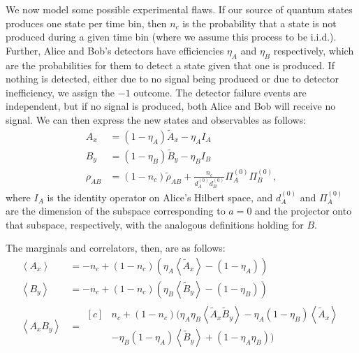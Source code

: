 \documentclass[10pt, a4paper]{article}
\numberwithin{equation}{section} %
\theoremstyle{definition}
\theoremstyle{plain}
\newcommand{\?}{\mathrel{?}} %
\newcommand{\angleb}[1]{\left\langle #1 \right\rangle} %
\begin{document}
    We now model some possible experimental flaws. If our source of quantum states produces one state per time bin, then \(n_c\) is the probability that a state is not produced during a given time bin (where we assume this process to be i.i.d.). Further, Alice and Bob's detectors have efficiencies \(\eta_A\) and \(\eta_B\) respectively, which are the probabilities for them to detect a state given that one is produced. If nothing is detected, either due to no signal being produced or due to detector inefficiency, we assign the \(-1\) outcome. The detector failure events are independent, but if no signal is produced, both Alice and Bob will receive no signal. We can then express the new states and observables as follows:
    \begin{align*}
      A_x &= (1-\eta_A)\tilde{A}_x - \eta_A I_A \\
      B_y &= (1-\eta_B)\tilde{B}_y - \eta_B I_B \\
      \rho_{AB} &= (1-n_c)\tilde{\rho}_{AB} + \frac{n_c}{d^{(0)}_A d^{(0)}_B} \Pi_A^{(0)} \Pi_B^{(0)},
    \end{align*}
    where \(I_A\) is the identity operator on Alice's Hilbert space, and \(d_A^{(0)}\) and \(\Pi_A^{(0)}\) are the dimension of the subspace corresponding to \(a={0}\) and the projector onto that subspace, respectively, with the analogous definitions holding for \(B\).

    The marginals and correlators, then, are as follows:
    \begin{align*}
      \angleb{A_x} &= -n_c + (1-n_c)(\eta_A\angleb{\tilde{A}_x} - (1-\eta_A)) \\
      \angleb{B_y} &= -n_c + (1-n_c)(\eta_B\angleb{\tilde{B}_y} - (1-\eta_B)) \\
      \angleb{A_x B_y} &= \begin{aligned}[c]
      & n_c + (1-n_c)(\eta_A\eta_B\angleb{\tilde{A}_x\tilde{B}_y} - \eta_A(1-\eta_B)\angleb{\tilde{A}_x} \\
      & -\eta_B(1-\eta_A)\angleb{\tilde{B}_y} + (1-\eta_A\eta_B) )
      \end{aligned}
      \end{align*}
\end{document}
